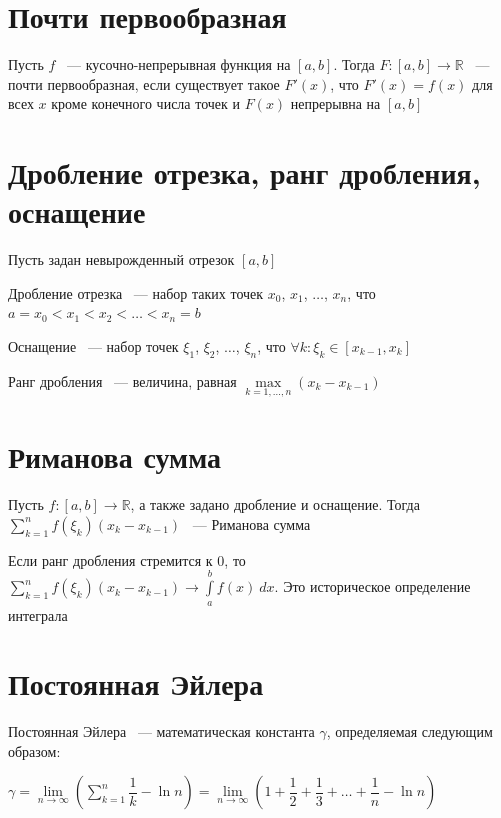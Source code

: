 \documentclass{article}
\begin{document}
	\newpage
	
	\section{Почти первообразная}
	
		Пусть $f$ ~--- кусочно-непрерывная функция на $[a, b]$. Тогда $F : [a, b] \rightarrow \mathbb{R}$ ~--- почти первообразная, если существует такое $F'(x)$, что $F'(x) = f(x)$ для всех $x$ кроме конечного числа точек и $F(x)$ непрерывна на $[a, b]$

	\newpage

	\section{Дробление отрезка, ранг дробления, оснащение}

		Пусть задан невырожденный отрезок $[a, b]$

		Дробление отрезка ~--- набор таких точек $x_0$, $x_1$, $\ldots$, $x_n$, что $a = x_0 < x_1 < x_2 < \ldots < x_n = b$

		Оснащение ~--- набор точек $\xi_1$, $\xi_2$, $\ldots$, $\xi_n$, что $\forall k : \xi_k \in [x_{k - 1}, x_k]$

		Ранг дробления ~--- величина, равная $\max\limits_{k = 1, \ldots, n} (x_k - x_{k - 1})$
	
	\newpage

	\section{Риманова сумма}

		Пусть $f : [a, b] \rightarrow \mathbb{R}$, а также задано дробление и оснащение. Тогда $\sum\limits^n_{k = 1} f(\xi_k) (x_k - x_{k - 1})$ ~--- Риманова сумма

		Если ранг дробления стремится к $0$, то $\sum\limits^n_{k = 1} f(\xi_k)(x_k - x_{k - 1}) \rightarrow \int\limits^b_a f(x) \ dx$. Это историческое определение интеграла

	\newpage

	\section{Постоянная Эйлера}
    
        Постоянная Эйлера ~--- математическая константа $\gamma$, определяемая следующим образом:
        
        $\gamma = \lim\limits_{n \rightarrow \infty} \left( \sum\limits^n_{k = 1} \dfrac{1}{k} - \ln{n} \right) = \lim\limits_{n \rightarrow \infty} \left( 1 + \dfrac{1}{2} + \dfrac{1}{3} + \ldots + \dfrac{1}{n} - \ln{n} \right)$
        
\end{document}
